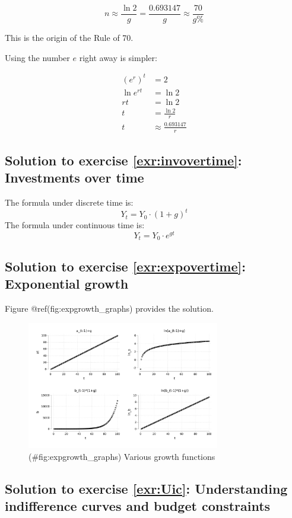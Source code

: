 \documentclass[
  12pt,
  oneside]{book}
\theoremstyle{definition}
\theoremstyle{definition}
\theoremstyle{definition}
\theoremstyle{definition}
\theoremstyle{remark}
\begin{document}
\[n \approx \frac{\ln 2}{g} = \frac{0.693147}{g} \approx \frac{70}{g\%}\]

This is the origin of the Rule of 70.

Using the number \(e\) right away is simpler:

\begin{align*}
(e^r)^t &= 2 \\
\ln e^{rt} &= \ln 2 \\
rt &= \ln 2 \\
t &= \frac{\ln 2}{r} \\
t &\approx \frac{0.693147}{r}
\end{align*}

\hypertarget{sol:invovertime}{%
\subsection*{Solution to exercise \ref{exr:invovertime}: Investments over time}\label{sol:invovertime}}

The formula under discrete time is:
\[
Y_t=Y_0\cdot (1+g)^t
\]
The formula under continuous time is:
\[
Y_t=Y_0\cdot e^{gt}
\]

\hypertarget{sol:expovertime}{%
\subsection*{Solution to exercise \ref{exr:expovertime}: Exponential growth}\label{sol:expovertime}}

Figure @ref(fig:expgrowth\_graphs) provides the solution.

\begin{figure}
\centering
\includegraphics[width=0.75\textwidth,height=\textheight]{fig/expgrowth_graphs.png}
\caption{(\#fig:expgrowth\_graphs) Various growth functions}
\end{figure}

\hypertarget{sol:Uic}{%
\subsection*{Solution to exercise \ref{exr:Uic}: Understanding indifference curves and budget constraints}\label{sol:Uic}}
\end{document}
